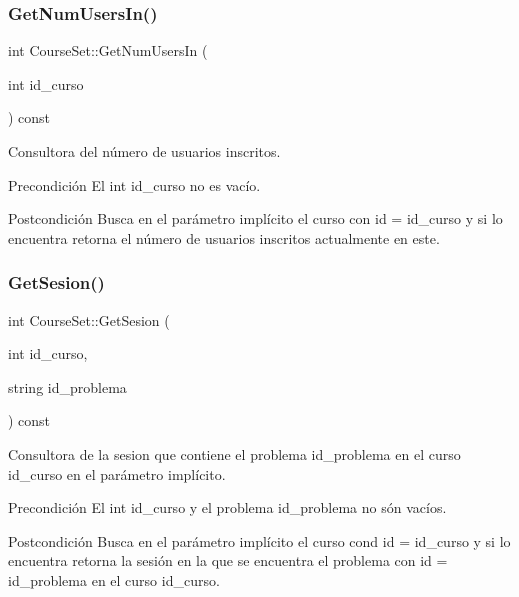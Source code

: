 \subsubsection{\texorpdfstring{Get\+Num\+Users\+In()}{GetNumUsersIn()}}
{\footnotesize\ttfamily int Course\+Set\+::\+Get\+Num\+Users\+In (\begin{DoxyParamCaption}\item[{int}]{id\+\_\+curso }\end{DoxyParamCaption}) const}



Consultora del número de usuarios inscritos. 

\begin{DoxyPrecond}{Precondición}
El int id\+\_\+curso no es vacío. 
\end{DoxyPrecond}
\begin{DoxyPostcond}{Postcondición}
Busca en el parámetro implícito el curso con id = id\+\_\+curso y si lo encuentra retorna el número de usuarios inscritos actualmente en este. 
\end{DoxyPostcond}
\mbox{\label{class_course_set_a534fa228ab549072198b0966d159a530}} 
\subsubsection{\texorpdfstring{Get\+Sesion()}{GetSesion()}}
{\footnotesize\ttfamily int Course\+Set\+::\+Get\+Sesion (\begin{DoxyParamCaption}\item[{int}]{id\+\_\+curso,  }\item[{string}]{id\+\_\+problema }\end{DoxyParamCaption}) const}



Consultora de la sesion que contiene el problema id\+\_\+problema en el curso id\+\_\+curso en el parámetro implícito. 

\begin{DoxyPrecond}{Precondición}
El int id\+\_\+curso y el problema id\+\_\+problema no són vacíos. 
\end{DoxyPrecond}
\begin{DoxyPostcond}{Postcondición}
Busca en el parámetro implícito el curso cond id = id\+\_\+curso y si lo encuentra retorna la sesión en la que se encuentra el problema con id = id\+\_\+problema en el curso id\+\_\+curso. 
\end{DoxyPostcond}
\mbox{\label{class_course_set_a96eb35134feb996fdef57895074a33ff}} 
